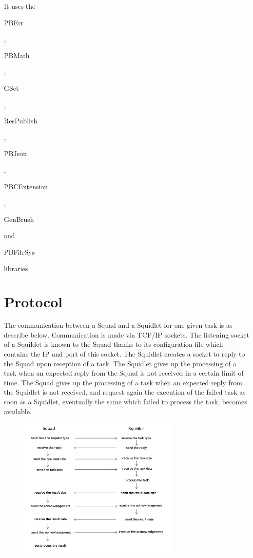 It uses the \begin{ttfamily}PBErr\end{ttfamily}, \begin{ttfamily}PBMath\end{ttfamily}, \begin{ttfamily}GSet\end{ttfamily}, \begin{ttfamily}ResPublish\end{ttfamily}, \begin{ttfamily}PBJson\end{ttfamily}, \begin{ttfamily}PBCExtension\end{ttfamily}, \begin{ttfamily}GenBrush\end{ttfamily} and \begin{ttfamily}PBFileSys\end{ttfamily} libraries.\\

\section{Protocol}

The communication between a Squad and a Squidlet for one given task is as describe below. Communication is made via TCP/IP sockets. The listening socket of a Squildet is known to the Squad thanks to its configuration file which contains the IP and port of this socket. The Squidlet creates a socket to reply to the Squad upon reception of a task. The Squidlet gives up the processing of a task when an expected reply from the Squad is not received in a certain limit of time. The Squad gives up the processing of a task when an expected reply from the Squidlet is not received, and request again the execution of the failed task as soon as a Squidlet, eventually the same which failed to process the task, becomes available.\\

\begin{center}
\begin{figure}[H]
\centering\includegraphics[width=8cm]{./protocol.png}\\
\end{figure}
\end{center}

